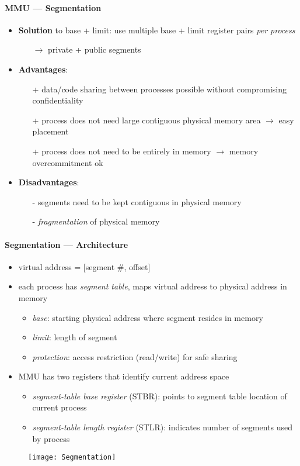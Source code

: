 \paragraph{MMU --- Segmentation}
\begin{itemize}
  \item \textbf{Solution} to base + limit: use multiple base + limit register pairs \emph{per process}
  \begin{itemize}
    \item[$ \to $] private + public segments
  \end{itemize}
  \item \textbf{Advantages}:
  \begin{itemize}
    \item[+] data/code sharing between processes possible without compromising confidentiality
    \item[+] process does not need large contiguous physical memory area \( \to \) easy placement
    \item[+] process does not need to be entirely in memory \( \to \) memory overcommitment ok
  \end{itemize}
  \item \textbf{Disadvantages}:
  \begin{itemize}
    \item[-] segments need to be kept contiguous in physical memory
    \item[-] \emph{fragmentation} of physical memory
  \end{itemize}
\end{itemize}

\paragraph{Segmentation --- Architecture}
\begin{itemize}
  \item virtual address = [segment \#, offset]
  \item each process has \emph{segment table}, maps virtual address to physical address in memory
  \begin{itemize}
    \item \emph{base}: starting physical address where segment resides in memory
    \item \emph{limit}: length of segment
    \item \emph{protection}: access restriction (read/write) for safe sharing
  \end{itemize}
  \item MMU has two registers that identify current address space
  \begin{itemize}
    \item \emph{segment-table base register} (STBR): points to segment table location of current process
    \item \emph{segment-table length register} (STLR): indicates number of segments used by process
  \end{itemize}
\end{itemize}
\begin{figure}[h]\centering\label{Segmentation}\texttt{[image: Segmentation]}\end{figure}

